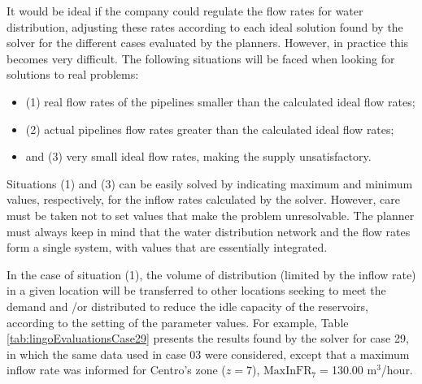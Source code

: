 \documentclass{singlecol}
\theoremstyle{TH}{
\newtheorem{lemma}{Lemma}
\newtheorem{theorem}[lemma]{Theorem}
\newtheorem{corrolary}[lemma]{Corrolary}
\newtheorem{conjecture}[lemma]{Conjecture}
\newtheorem{proposition}[lemma]{Proposition}
\newtheorem{claim}[lemma]{Claim}
\newtheorem{stheorem}[lemma]{Wrong Theorem}
\newtheorem{algorithm}{Algorithm}
}
\theoremstyle{THrm}{
\newtheorem{definition}{Definition}[section]
\newtheorem{question}{Question}[section]
\newtheorem{remark}{Remark}
\newtheorem{scheme}{Scheme}
}
\theoremstyle{THhit}{
\newtheorem{case}{Case}[section]
}
\begin{document}
It would be ideal if the company could regulate the flow rates for water distribution, adjusting these rates according to each ideal solution found by the solver for the different cases evaluated by the planners. However, in practice this becomes very difficult. The following situations will be faced when looking for solutions to real problems:

\begin{itemize}
\item (1) real flow rates of the pipelines smaller than the calculated ideal flow rates;
\item (2) actual pipelines flow rates greater than the calculated ideal flow rates;
\item and (3) very small ideal flow rates, making the supply unsatisfactory.
\end{itemize}

Situations (1) and (3) can be easily solved by indicating maximum and minimum values, respectively, for the inflow rates calculated by the solver. However, care must be taken not to set values that make the problem unresolvable. The planner must always keep in mind that the water distribution network and the flow rates form a single system, with values that are essentially integrated.

In the case of situation (1), the volume of distribution (limited by the inflow rate) in a given location will be transferred to other locations seeking to meet the demand and \slash or distributed to reduce the idle capacity of the reservoirs, according to the setting of the parameter values. For example, Table \ref{tab:lingoEvaluationsCase29} presents the results found by the solver for case 29, in which the same data used in case 03 were considered, except that a maximum inflow rate was informed for Centro's zone ($z = 7$), $\mathrm{MaxInFR}_7 = $130.00 $\mathrm{m^3}$/hour.
\end{document}
